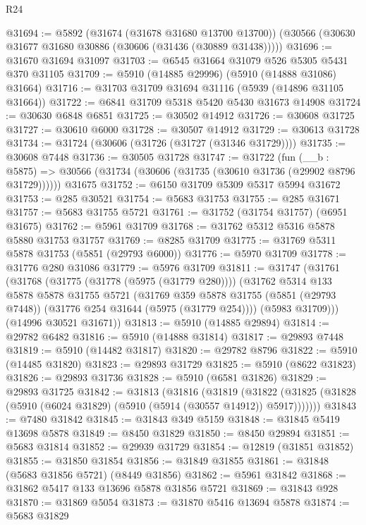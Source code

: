 \begin{lexlean}{R24}
\begin{coremodule}
@31694 := @5892
    (@31674 (@31678 @31680 @13700 @13700))
    (@30566 (@30630 @31677 @31680 @30886 (@30606 (@31436 (@30889 @31438)))))
@31696 := @31670 @31694 @31097
@31703 := @6545 @31664 @31079 @526 @5305 @5431 @370 @31105
@31709 := @5910 (@14885 @29996) (@5910 (@14888 @31086) @31664)
@31716 := @31703 @31709 @31694 @31116 (@5939 (@14896 @31105 @31664))
@31722 := @6841 @31709 @5318 @5420 @5430 @31673 @14908
@31724 := @30630 @6848 @6851
@31725 := @30502 @14912
@31726 := @30608 @31725
@31727 := @30610 @6000
@31728 := @30507 @14912
@31729 := @30613 @31728
@31734 := @31724 (@30606 (@31726 (@31727 (@31346 @31729))))
@31735 := @30608 @7448
@31736 := @30505 @31728
@31747 := @31722
    (fun (__b : @5875) => @30566 (@31734 (@30606 (@31735 (@30610 @31736 (@29902 @8796 @31729))))))
    @31675
@31752 := @6150 @31709 @5309 @5317 @5994 @31672
@31753 := @285 @30521
@31754 := @5683 @31753
@31755 := @285 @31671
@31757 := @5683 @31755 @5721
@31761 := @31752 (@31754 @31757) (@6951 @31675)
@31762 := @5961 @31709
@31768 := @31762 @5312 @5316 @5878 @5880 @31753 @31757
@31769 := @8285 @31709
@31775 := @31769 @5311 @5878 @31753 (@5851 (@29793 @6000))
@31776 := @5970 @31709
@31778 := @31776 @280 @31086
@31779 := @5976 @31709
@31811 := @31747
    (@31761
      (@31768
        (@31775 (@31778 (@5975 (@31779 @280))))
        (@31762
          @5314
          @133
          @5878
          @5878
          @31755
          @5721
          (@31769
            @359
            @5878
            @31755
            (@5851 (@29793 @7448))
            (@31776 @254 @31644 (@5975 (@31779 @254))))
          (@5983 @31709)))
      (@14996 @30521 @31671))
@31813 := @5910 (@14885 @29894)
@31814 := @29782 @6482
@31816 := @5910 (@14888 @31814)
@31817 := @29893 @7448
@31819 := @5910 (@14482 @31817)
@31820 := @29782 @8796
@31822 := @5910 (@14485 @31820)
@31823 := @29893 @31729
@31825 := @5910 (@8622 @31823)
@31826 := @29893 @31736
@31828 := @5910 (@6581 @31826)
@31829 := @29893 @31725
@31842 := @31813
    (@31816
      (@31819
        (@31822 (@31825 (@31828 (@5910 (@6024 @31829) (@5910 (@5914 (@30557 @14912)) @5917)))))))
@31843 := @7480 @31842
@31845 := @31843 @349 @5159
@31848 := @31845 @5419 @13698 @5878
@31849 := @8450 @31829
@31850 := @8450 @29894
@31851 := @5683 @31814
@31852 := @29939 @31729
@31854 := @12819 (@31851 @31852)
@31855 := @31850 @31854
@31856 := @31849 @31855
@31861 := @31848 (@5683 @31856 @5721) (@8449 @31856)
@31862 := @5961 @31842
@31868 := @31862 @5417 @133 @13696 @5878 @31856 @5721
@31869 := @31843 @928
@31870 := @31869 @5054
@31873 := @31870 @5416 @13694 @5878
@31874 := @5683 @31829

\end{coremodule}
\end{lexlean}
